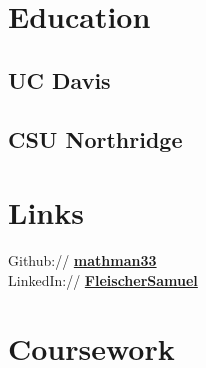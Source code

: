\documentclass[letterpaper]{deedy-resume} %
\begin{document}
\begin{minipage}[t]{0.33\textwidth} %


\section{Education} 

\subsection{UC Davis}


\sectionspace %

\subsection{CSU Northridge}


\sectionspace %


\section{Links} 

Github:// \href{https://github.com/mathman33}{\bf mathman33} \\
LinkedIn:// \href{https://www.linkedin.com/in/FleischerSamuel}{\bf FleischerSamuel} \\

\sectionspace %


\section{Coursework}


\end{minipage}
\end{document}
